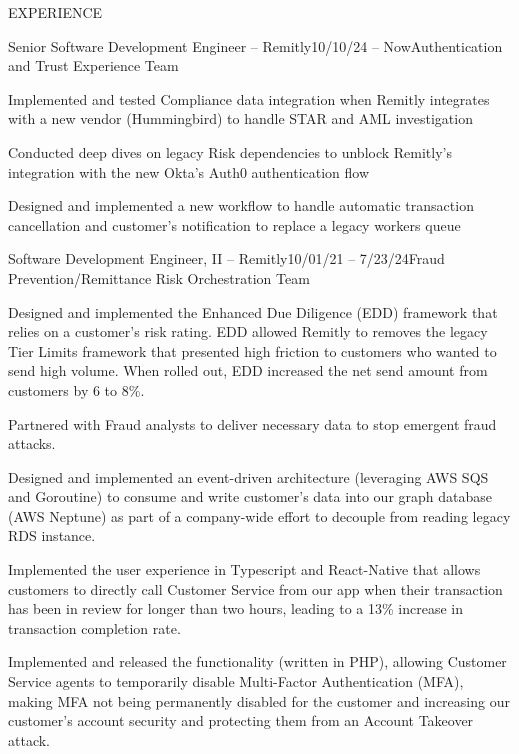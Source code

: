 \documentclass{resume} %
\begin{document}
\begin{rSection}{EXPERIENCE}

    \begin{rSubsection}{Senior Software Development Engineer -- Remitly}{10/10/24 -- Now}{Authentication and Trust Experience Team}{}
        \item Implemented and tested Compliance data  integration when Remitly integrates with a new vendor (Hummingbird) to handle STAR and AML investigation
        \item Conducted deep dives on legacy Risk dependencies to unblock Remitly's integration with the new Okta's Auth0 authentication flow
        \item Designed and implemented a new workflow to handle automatic transaction cancellation and customer's notification to replace a legacy workers queue
    \end{rSubsection}


    \begin{rSubsection}{Software Development Engineer, II -- Remitly}{10/01/21 -- 7/23/24}{Fraud Prevention/Remittance Risk Orchestration Team}{}
        \item Designed and implemented the Enhanced Due Diligence (EDD) framework that relies on a customer’s risk rating. EDD allowed Remitly to removes the legacy Tier Limits framework that presented high friction to customers who wanted to send high volume. When rolled out, EDD increased the net send amount from customers by 6 to 8\%.
        \item Partnered with Fraud analysts to deliver necessary data to stop emergent fraud attacks.
        \item Designed and implemented an event-driven architecture (leveraging AWS SQS and Goroutine) to consume and write customer’s data into our graph database (AWS Neptune) as part of a company-wide effort to decouple from reading legacy RDS instance.
        \item Implemented the user experience in Typescript and React-Native that allows customers to directly call Customer Service from our app when their transaction has been in review for longer than two hours, leading to a 13\% increase in transaction completion rate.
        \item Implemented and released the functionality (written in PHP), allowing Customer Service agents to temporarily disable Multi-Factor Authentication (MFA), making MFA not being permanently disabled for the customer and increasing our customer’s account security and protecting them from an Account Takeover attack.
    \end{rSubsection}
    

\end{rSection}
\end{document}
